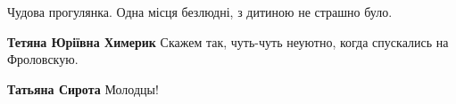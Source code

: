  
 
 
 
 



Чудова прогулянка. Одна місця безлюдні, з дитиною не страшно було.

\textbf{Тетяна Юріївна Химерик} Скажем так, чуть-чуть неуютно, когда спускались на Фроловскую.

\textbf{Татьяна Сирота} Молодцы!
